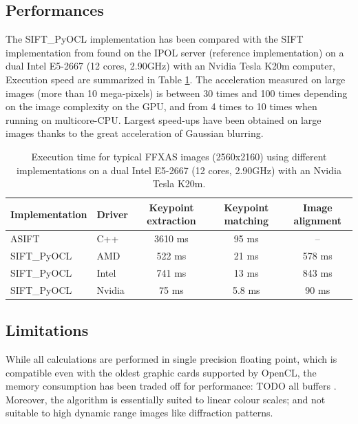\documentclass[preprint]{iucr}
\begin{document}
\subsection{Performances}

The SIFT\_PyOCL implementation has been compared with the SIFT
implementation from \cite{ASIFT} found on the IPOL server (reference
implementation) on a dual Intel E5-2667 (12 cores, 2.90GHz) with an Nvidia Tesla
K20m computer, Execution speed are summarized in Table \ref{bench}.
The acceleration measured on large images (more than 10 mega-pixels) is between
30 times and 100 times depending on the image complexity on the GPU, and from 4
times to 10 times when running on multicore-CPU.
Largest speed-ups have been obtained on large images thanks to the
great acceleration of Gaussian blurring.

\begin{table}
\caption{Execution time for typical FFXAS images (2560x2160) using different
implementations on a dual Intel E5-2667 (12 cores, 2.90GHz) with an Nvidia Tesla
K20m.}
\label{bench}
\vspace{1mm}
\begin{center}
\begin{tabular}{l l ccc}
Implementation & Driver & Keypoint extraction & Keypoint matching &
Image alignment\\
\hline
ASIFT        &   C++     &   3610 ms  & 95 ms  & --  \\
SIFT\_PyOCL  &   AMD  &   522 ms  &  21 ms&  578 ms \\
SIFT\_PyOCL  &   Intel  &   741 ms  &  13 ms&  843 ms\\
SIFT\_PyOCL  &   Nvidia  &    75 ms  &  5.8 ms & 90 ms\\
\end{tabular}
\end{center}
\end{table}



\subsection{Limitations}
While all calculations are performed in single precision floating point,
which is compatible even with the oldest graphic cards supported by OpenCL, the
memory consumption has been traded off for performance: TODO all buffers .
Moreover, the algorithm is essentially suited
to linear colour scales; and  not suitable to high dynamic range
images like diffraction patterns.
\end{document}
